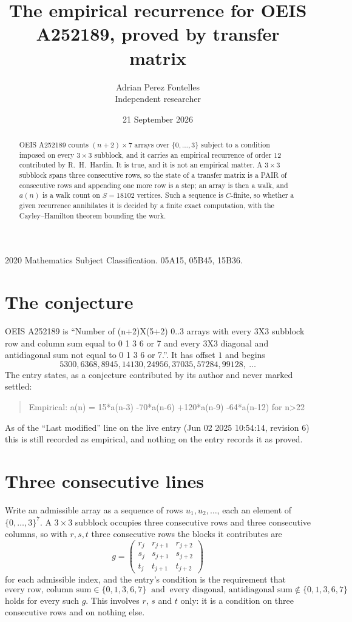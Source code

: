 \documentclass[11pt,a4paper]{article}
\title{The empirical recurrence for OEIS A252189, proved by transfer matrix}
\author{Adrian Perez Fontelles\\ \small Independent researcher}
\date{21 September 2026}
\theoremstyle{plain}
\theoremstyle{definition}
\begin{document}
\maketitle

\begin{abstract}
OEIS A252189 counts $(n+2)\times7$ arrays over $\{0,\dots,3\}$ subject to a condition imposed on
every $3\times3$ subblock, and it carries an empirical recurrence of order $12$
contributed by R.~H.~Hardin. It is true, and it is not an empirical matter. A $3\times3$
subblock spans three consecutive rows, so the state of a transfer matrix is a PAIR of
consecutive rows and appending one more row is a step; an array is then a walk, and
$a(n)$ is a walk count on $S=18102$ vertices. Such a sequence is $C$-finite, so whether a given
recurrence annihilates it is decided by a finite exact computation, with the Cayley--Hamilton
theorem bounding the work.
\end{abstract}

\noindent\small 2020 Mathematics Subject Classification. 05A15, 05B45, 15B36.\normalsize

\section{The conjecture}

OEIS A252189 is ``Number of (n+2)X(5+2) 0..3 arrays with every 3X3 subblock row and column sum equal to 0 1 3 6 or 7 and every 3X3 diagonal and antidiagonal sum not equal to 0 1 3 6 or 7.''. It has offset $1$ and begins
\[
5300, 6368, 8945, 14130, 24956, 37035, 57284, 99128,\ \dots
\]
The entry states, as a conjecture contributed by its author and never marked settled:
\begin{quote}
Empirical: a(n) = 15*a(n-3) -70*a(n-6) +120*a(n-9) -64*a(n-12) for n>22
\end{quote}
As of the ``Last modified'' line on the live entry (Jun 02 2025 10:54:14, revision 6) this is still
recorded as empirical, and nothing on the entry records it as proved.

\section{Three consecutive lines}

Write an admissible array as a sequence of rows $u_1,u_2,\dots$, each an element of
$\{0,\dots,3\}^{7}$. A $3\times3$ subblock occupies three consecutive rows and
three consecutive columns, so with $r,s,t$ three consecutive rows the blocks it
contributes are
\[
g=\begin{pmatrix}r_j&r_{j+1}&r_{j+2}\\ s_j&s_{j+1}&s_{j+2}\\ t_j&t_{j+1}&t_{j+2}\end{pmatrix}
\]
for each admissible index, and the entry's condition is the requirement that
\[
\text{every row, column sum} \in \{0,1,3,6,7\}\ \text{ and }\ \text{every diagonal, antidiagonal sum} \notin \{0,1,3,6,7\}
\]
holds for every such $g$. This involves $r$, $s$ and $t$ only: it is a condition on
three consecutive rows and on nothing else.
\end{document}
